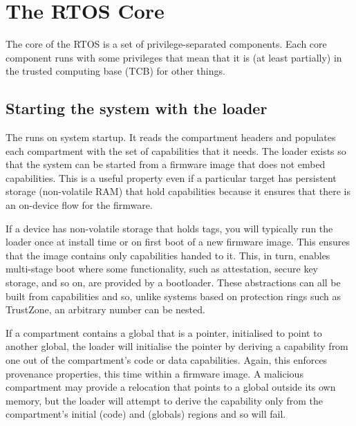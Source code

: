 \chapter{The RTOS Core}

The core of the RTOS is a set of privilege-separated components.
Each core component runs with some privileges that mean that it is (at least partially) in the trusted computing base (TCB) for other things.


\section{Starting the system with the loader}

The  runs on system startup.
It reads the compartment headers and populates each compartment with the set of capabilities that it needs.
The loader exists so that the system can be started from a firmware image that does not embed capabilities.
This is a useful property even if a particular target has persistent storage (non-volatile RAM) that  hold capabilities because it ensures that there is an on-device  flow for the firmware.

If a device has non-volatile storage that holds tags, you will typically run the loader once at install time or on first boot of a new firmware image.
This ensures that the image contains only capabilities handed to it.
This, in turn, enables multi-stage boot where some functionality, such as attestation, secure key storage, and so on, are provided by a bootloader.
These abstractions can all be built from capabilities and so, unlike systems based on protection rings such as TrustZone, an arbitrary number can be nested.

If a compartment contains a global that is a pointer, initialised to point to another global, the loader will initialise the pointer by deriving a capability from one out of the compartment's code or data capabilities.
Again, this enforces provenance properties, this time within a firmware image.
A malicious compartment may provide a relocation that points to a global outside its own memory, but the loader will attempt to derive the capability only from the compartment's initial  (code) and  (globals) regions and so will fail.

